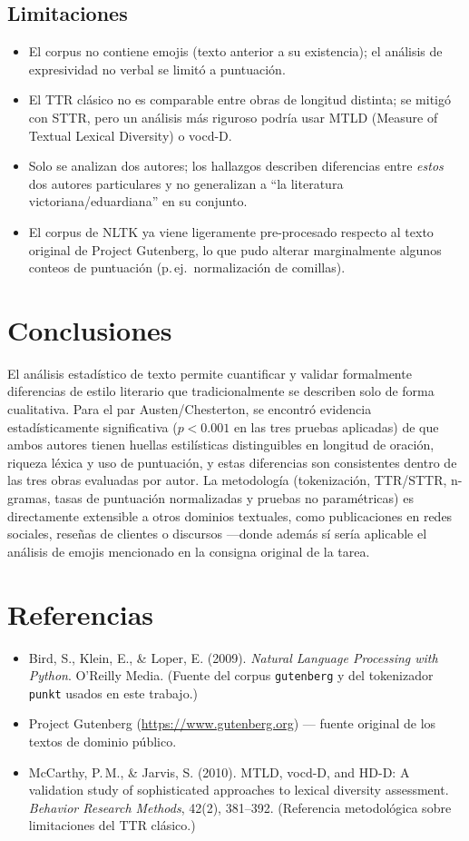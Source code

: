 \documentclass[11pt]{article}
\begin{document}
\subsection{Limitaciones}
\begin{itemize}
    \item El corpus no contiene emojis (texto anterior a su existencia); el análisis de expresividad no verbal se limitó a puntuación.
    \item El TTR clásico no es comparable entre obras de longitud distinta; se mitigó con STTR, pero un análisis más riguroso podría usar MTLD (Measure of Textual Lexical Diversity) o vocd-D.
    \item Solo se analizan dos autores; los hallazgos describen diferencias entre \emph{estos} dos autores particulares y no generalizan a ``la literatura victoriana/eduardiana'' en su conjunto.
    \item El corpus de NLTK ya viene ligeramente pre-procesado respecto al texto original de Project Gutenberg, lo que pudo alterar marginalmente algunos conteos de puntuación (p.\,ej.\ normalización de comillas).
\end{itemize}

\section{Conclusiones}

El análisis estadístico de texto permite cuantificar y validar formalmente diferencias de estilo literario que tradicionalmente se describen solo de forma cualitativa. Para el par Austen/Chesterton, se encontró evidencia estadísticamente significativa ($p < 0.001$ en las tres pruebas aplicadas) de que ambos autores tienen huellas estilísticas distinguibles en longitud de oración, riqueza léxica y uso de puntuación, y estas diferencias son consistentes dentro de las tres obras evaluadas por autor. La metodología (tokenización, TTR/STTR, n-gramas, tasas de puntuación normalizadas y pruebas no paramétricas) es directamente extensible a otros dominios textuales, como publicaciones en redes sociales, reseñas de clientes o discursos —donde además sí sería aplicable el análisis de emojis mencionado en la consigna original de la tarea.

\section*{Referencias}
\begin{itemize}
    \item Bird, S., Klein, E., \& Loper, E. (2009). \textit{Natural Language Processing with Python}. O'Reilly Media. (Fuente del corpus \texttt{gutenberg} y del tokenizador \texttt{punkt} usados en este trabajo.)
    \item Project Gutenberg (\url{https://www.gutenberg.org}) — fuente original de los textos de dominio público.
    \item McCarthy, P.\,M., \& Jarvis, S. (2010). MTLD, vocd-D, and HD-D: A validation study of sophisticated approaches to lexical diversity assessment. \textit{Behavior Research Methods}, 42(2), 381--392. (Referencia metodológica sobre limitaciones del TTR clásico.)
\end{itemize}
\end{document}
